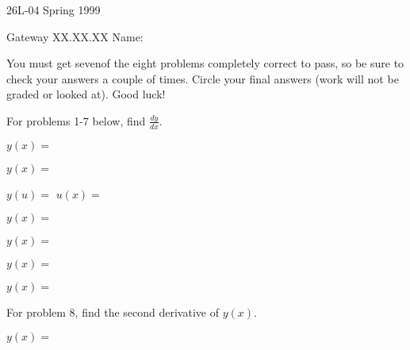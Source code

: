 \documentclass[11pt,epsfig]{article}
\begin{document}
26L-04 Spring 1999 

Gateway XX.XX.XX \hfill {Name:} {\underline {\hspace{2.5in}}}
\vspace{2pc}

You must get sevenof the eight problems completely correct to pass, 
so be sure to check your answers a couple of times.  Circle your 
final answers (work will not be graded or looked at). Good luck!

\vspace{2pc}

For problems 1-7 below, find $\displaystyle\frac{dy}{dx}$.

\begin{problem}{0}
$\displaystyle y(x)= $
\end{problem}
\vfill

\begin{problem}{0}
$\displaystyle y(x)= $
\end{problem}
\vfill

\begin{problem}{0}
$\displaystyle y(u)= $ 
\hspace{.2 in} $\displaystyle u(x)= $
\end{problem}
\vfill

\begin{problem}{0}
$\displaystyle y(x)= $
\end{problem}
\vfill

\begin{problem}{0}
$\displaystyle y(x)= $
\end{problem}
\vfill

\begin{problem}{0}
$\displaystyle y(x)= $
\end{problem}
\vfill

\begin{problem}{0}
$\displaystyle y(x)= $
\end{problem}
\vfill

For problem 8, find the second derivative of $y(x)$.

\begin{problem}{0}
$\displaystyle y(x)= $
\end{problem}
\vfill
\end{document}

